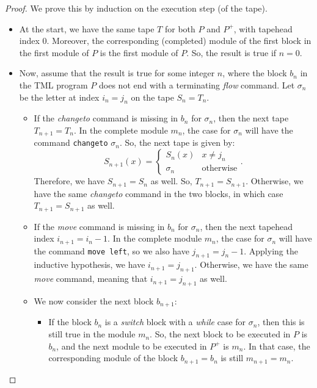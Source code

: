 \documentclass{article}
\begin{document}
    \begin{proof}
        We prove this by induction on the execution step (of the tape). 
        \begin{itemize}
            \item At the start, we have the same tape $T$ for both $P$ and $P^+$, with tapehead index 0. Moreover, the corresponding (completed) module of the first block in the first module of $P$ is the first module of $P$. So, the result is true if $n = 0$. 
            \item Now, assume that the result is true for some integer $n$, where the block $b_n$ in the TML program $P$ does not end with a terminating \textit{flow} command. Let $\sigma_n$ be the letter at index $i_n = j_n$ on the tape $S_n = T_n$.
            \begin{itemize}
                \item If the \textit{changeto} command is missing in $b_n$ for $\sigma_n$, then the next tape $T_{n+1} = T_n$. In the complete module $m_n$, the case for $\sigma_n$ will have the command \texttt{changeto} $\sigma_n$. So, the next tape is given by:
                \[S_{n+1}(x) = \begin{cases}
                    S_n(x) & x \neq j_n \\
                    \sigma_n & \text{otherwise}
                \end{cases}.\]
                Therefore, we have $S_{n+1} = S_n$ as well. So, $T_{n+1} = S_{n+1}$. Otherwise, we have the same \textit{changeto} command in the two blocks, in which case $T_{n+1} = S_{n+1}$ as well.
                
                \item If the \textit{move} command is missing in $b_n$ for $\sigma_n$, then the next tapehead index $i_{n+1} = i_n - 1$. In the complete module $m_n$, the case for $\sigma_n$ will have the command \texttt{move left}, so we also have $j_{n+1} = j_n - 1$. Applying the inductive hypothesis, we have $i_{n+1} = j_{n+1}$. Otherwise, we have the same \textit{move} command, meaning that $i_{n+1} = j_{n+1}$ as well.
                
                \item We now consider the next block $b_{n+1}$:
                \begin{itemize}
                    \item If the block $b_n$ is a \textit{switch} block with a \textit{while} case for $\sigma_n$, then this is still true in the module $m_n$. So, the next block to be executed in $P$ is $b_n$, and the next module to be executed in $P^+$ is $m_n$. In that case, the corresponding module of the block $b_{n+1} = b_n$ is still $m_{n+1} = m_n$.
        

\end{itemize}
\end{itemize}
\end{itemize}
\end{proof}
\end{document}
